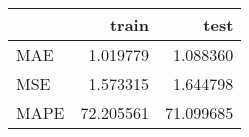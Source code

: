 \begin{tabular}{lrr}
\toprule
{} &      train &       test \\
\midrule
MAE  &   1.019779 &   1.088360 \\
MSE  &   1.573315 &   1.644798 \\
MAPE &  72.205561 &  71.099685 \\
\bottomrule
\end{tabular}
